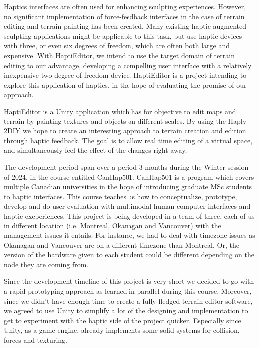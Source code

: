 Haptics interfaces are often used for enhancing sculpting experiences.
However, no significant implementation of force-feedback interfaces in the case of terrain editing and terrain painting has been created.
Many existing haptic-augmented sculpting applications might be applicable to this task, but use haptic devices with three, or even six degrees of freedom, which are often both large and expensive.
With HaptiEditor, we intend to use the target domain of terrain editing to our advantage, developing a compelling user interface with a relatively inexpensive two degree of freedom device.
HaptiEditor is a project intending to explore this application of haptics, in the hope of evaluating the promise of our approach.

HaptiEditor is a Unity application which has for objective to edit maps and terrain by painting textures and objects on different scales. 
By using the Haply 2DIY we hope to create an interesting approach to terrain creation and edition through haptic feedback.
The goal is to allow real time editing of a virtual space, and simultaneously feel the effect of the changes right away.

The development period span over a period 3 months during the Winter session of 2024, in the course entitled CanHap501.
CanHap501 is a program which covers multiple Canadian universities in the hope of introducing graduate MSc students to haptic interfaces. 
This course teaches us how to conceptualize, prototype, develop and do user evaluation with multimodal human-computer interfaces and haptic exeperiences.
This project is being developed in a team of three, each of us in different location (i.e. Montreal, Okanagan and Vancouver) with the management issues it entails. 
For instance, we had to deal with timezone issues as Okanagan and Vancouver are on a different timezone than Montreal. 
Or, the version of the hardware given to each student could be different depending on the node they are coming from.

Since the development timeline of this project is very short we decided to go with a rapid prototyping approach as learned in parallel during this course.
Moreover, since we didn't have enough time to create a fully fledged terrain editor software,
we agreed to use Unity to simplify a lot of the designing and implementation to get to experiment with the haptic side of the project quicker.
Especially since Unity, as a game engine, already implements some solid systems for collision, forces and texturing.

